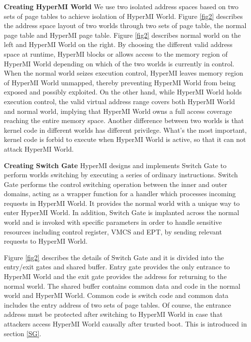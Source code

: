 \documentclass[conference]{IEEEtran}
\begin{document}
\textbf{Creating HyperMI World}
 We use two isolated address spaces based on two sets of page tables to achieve isolation of HyperMI World.
Figure \ref{fig2} describes the address space layout of two worlds through two sets of page table, the normal page table and HyperMI page table. Figure \ref{fig2} describes normal world on the left and HyperMI World on the right.
By choosing the different valid address space at runtime, HyperMI blocks or allows access to the memory region of HyperMI World depending on which of the two worlds is currently in control. When the normal world
seizes execution control, HyperMI leaves memory region of HyperMI World unmapped, thereby preventing HyperMI World from being exposed and possibly exploited. On
the other hand, while HyperMI World holds execution control,
the valid virtual address range covers both HyperMI World and normal world, implying that HyperMI World owns a full access coverage reaching the entire memory space.
Another difference between two worlds is that kernel code in different worlds has different privilege.
What's the most important, kernel code is forbid to execute when HyperMI World is active, so that it can not attack HyperMI World.

\textbf{Creating Switch Gate}
HyperMI designs and implements Switch Gate to perform worlds switching by executing a series of ordinary instructions.
Switch Gate performs the control switching operation between the inner and outer domains, acting as a wrapper function for a handler which processes incoming requests in HyperMI World. It provides the normal world with a unique way to enter HyperMI World. In addition, Switch Gate is implanted across the normal world and is invoked with specific parameters in order to handle sensitive resources including control register, VMCS and EPT, by sending relevant requests to HyperMI World.

Figure \ref{fig2} describes the details of Switch Gate and it is divided into the entry/exit gates and shared buffer.
Entry gate provides the only entrance to HyperMI World and the exit gate provides the address for returning to the normal world. The shared buffer contains common data and code in the normal world and HyperMI World. Common code is switch code and common data includes the entry address of two sets of page tables.
 Of course, the entrance address must be protected after switching to HyperMI World in case that attackers access HyperMI World causally after trusted boot. This is introduced in section \ref{SG}.
\end{document}
